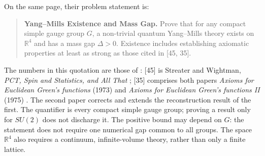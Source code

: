 On the same page, their problem statement is:
\begin{quote}
\textbf{Yang--Mills Existence and Mass Gap.} Prove that for any compact simple
gauge group $G$, a non-trivial quantum Yang--Mills theory exists on
$\mathbb R^4$ and has a mass gap $\Delta>0$. Existence includes establishing
axiomatic properties at least as strong as those cited in [45, 35].
\end{quote}
The numbers in this quotation are those of \cite{JaffeWitten2006}:
[45] is Streater and Wightman, \emph{PCT, Spin and Statistics, and All That}
\cite{StreaterWightman1964}; [35] comprises both papers
\emph{Axioms for Euclidean Green's functions} (1973) and
\emph{Axioms for Euclidean Green's functions II} (1975)
\cite{OsterwalderSchrader1973,OsterwalderSchrader1975}.
The second paper corrects and extends the reconstruction result of the
first. The quantifier is every compact simple gauge group; proving a result
only for $SU(2)$ does not discharge it. The positive bound may depend on
$G$: the statement does not require one numerical gap common to all groups.
The space $\mathbb R^4$ also requires a continuum, infinite-volume theory,
rather than only a finite lattice.

